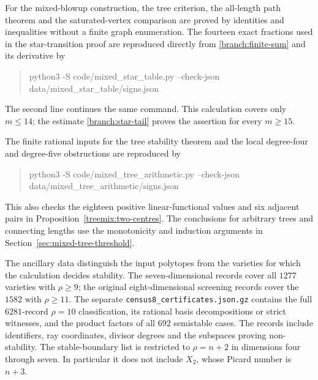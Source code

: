 For the mixed-blowup construction, the tree criterion, the all-length
path theorem and the saturated-vertex comparison are proved by identities
and inequalities without a finite graph enumeration. The fourteen exact
fractions used in the star-transition proof are reproduced directly from
\eqref{branch:finite-sum} and its derivative by
\begin{quote}
\small\ttfamily\raggedright
python3 -S code/mixed\_star\_table.py --check-json\\
\hspace*{1em}data/mixed\_star\_table/signs.json
\end{quote}
The second line continues the same command. This calculation covers only
$m\le14$; the estimate \eqref{branch:star-tail} proves the assertion
for every $m\ge15$.

The finite rational inputs for the tree stability theorem and the local
degree-four and degree-five obstructions are reproduced by
\begin{quote}
\small\ttfamily\raggedright
python3 -S code/mixed\_tree\_arithmetic.py --check-json\\
\hspace*{1em}data/mixed\_tree\_arithmetic/signs.json
\end{quote}
This also checks the eighteen positive linear-functional values and six
adjacent pairs in Proposition~\ref{treemix:two-centres}. The conclusions
for arbitrary trees and connecting lengths use the monotonicity and
induction arguments in Section~\ref{sec:mixed-tree-threshold}.

The ancillary data distinguish the input polytopes from the varieties
for which the calculation decides stability.  The seven-dimensional records
cover all $1277$ varieties with $\rho\ge9$; the original eight-dimensional
screening records cover the $1582$ with $\rho\ge11$. The separate
\texttt{census8\_certificates.json.gz} contains the full $6281$-record
$\rho=10$ classification, its rational basis decompositions or strict
witnesses, and the product factors of all $692$ semistable cases.
The records include identifiers,
ray coordinates, divisor degrees and the subspaces proving
non-stability.  The stable-boundary list is restricted to $\rho=n+2$
in dimensions four through seven.  In particular it does not include
$X_2$, whose Picard number is $n+3$.

